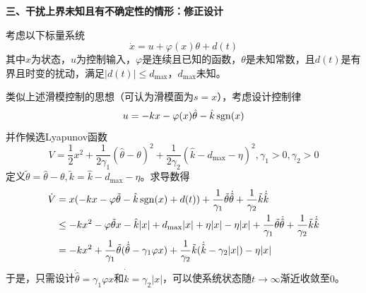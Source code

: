 \noindent\textbf{三、干扰上界未知且有不确定性的情形：修正设计}

考虑以下标量系统
\begin{equation}
    \dot{x} = u + \varphi(x)\theta + d(t)
\end{equation}
其中$x$为状态，$u$为控制输入，$\varphi$是连续且已知的函数，$\theta$是未知常数，且$d(t)$是有界且时变的扰动，满足$|d(t)|\le d_{\max}$，$d_{\max}$未知。

类似上述滑模控制的思想（可认为滑模面为$s=x$），考虑设计控制律\[u=-kx-\varphi(x)\hat{\theta}-\hat{k}\operatorname{sgn}(x)\]
并作候选Lyapunov函数\[V=\frac{1}{2}x^2+\frac{1}{2\gamma_1}(\hat{\theta}-\theta)^2+\frac{1}{2\gamma_2}(\hat{k}-d_{\max}-\eta)^2,\gamma_1>0,\gamma_2>0\]
定义$\tilde{\theta}=\hat{\theta}-\theta,\tilde{k}=\hat{k}-d_{\max}-\eta$。求导数得
\begin{align*}
    \dot{V}&=x(-kx-\varphi\tilde{\theta}-\hat{k}\operatorname{sgn}(x)+d(t))+\frac{1}{\gamma_1}\tilde{\theta}\dot{\hat{\theta}}+\frac{1}{\gamma_2}\tilde{k}\dot{\hat{k}}\\
    &\leq -kx^2-\varphi\tilde{\theta}x-\hat{k}|x|+d_{\max}|x|+\eta|x|-\eta|x|+\frac{1}{\gamma_1}\tilde{\theta}\dot{\hat{\theta}}+\frac{1}{\gamma_2}\tilde{k}\dot{\hat{k}}\\
    &=-kx^2+\frac{1}{\gamma_1}\tilde{\theta}(\dot{\hat{\theta}}-\gamma_1\varphi x)+\frac{1}{\gamma_2}\tilde{k}(\dot{\hat{k}}-\gamma_2|x|)-\eta|x|
\end{align*}
于是，只需设计$\dot{\hat{\theta}}=\gamma_1\varphi x$和$\dot{\hat{k}}=\gamma_2|x|$，可以使系统状态随$t\to\infty$渐近收敛至$0$。

